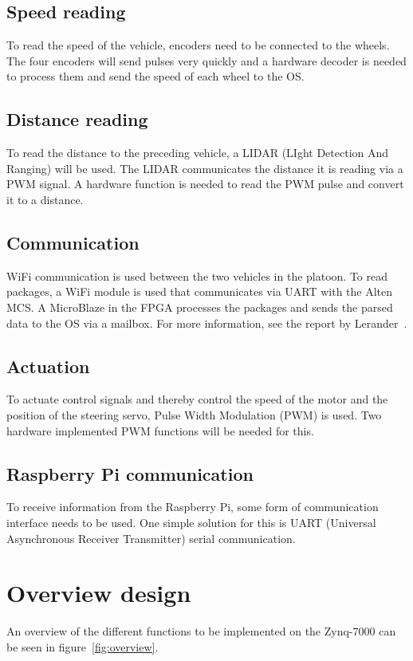 \subsection{Speed reading}
To read the speed of the vehicle, encoders need to be connected to the wheels. The four encoders will send pulses very quickly and a hardware decoder is needed to process them and send the speed of each wheel to the OS.

\subsection{Distance reading}
To read the distance to the preceding vehicle, a LIDAR (LIght Detection And Ranging) will be used. The LIDAR communicates the distance it is reading via a PWM signal. A hardware function is needed to read the PWM pulse and convert it to a distance.

\subsection{Communication}
WiFi communication is used between the two vehicles in the platoon. To read packages, a WiFi module is used that communicates via UART with the Alten MCS. A MicroBlaze in the FPGA processes the packages and sends the parsed data to the OS via a mailbox. For more information, see the report by Lerander~\cite{lerander2017}.

\subsection{Actuation}
To actuate control signals and thereby control the speed of the motor and the position of the steering servo, Pulse Width Modulation (PWM) is used. Two hardware implemented PWM functions will be needed for this.

\subsection{Raspberry Pi communication}
To receive information from the Raspberry Pi, some form of communication interface needs to be used. One simple solution for this is UART (Universal Asynchronous Receiver Transmitter) serial communication. 

\section{Overview design}
An overview of the different functions to be implemented on the Zynq-7000 can be seen in figure~\ref{fig:overview}.

